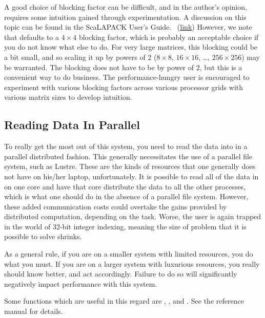 A good choice of blocking factor can be difficult, and in the author's opinion, requires some intuition gained through experimentation.  A discussion on this topic can be found in the ScaLAPACK User's Guide.~\citep{slug} (\href{http://www.netlib.org/utk/papers/scalapack/node19.html}{link}) However, we note that  defaults to a $4\times 4$ blocking factor, which is probably an acceptable choice if you do not know what else to do.  For very large matrices, this blocking could be a bit small, and so scaling it up by powers of 2 ($8\times 8$, $16\times 16$, \dots, $256\times 256$) may be warranted.  The blocking does not have to be by power of 2, but this is a convenient way to do business.  The performance-hungry user is encouraged to experiment with various blocking factors across various processor grids with various matrix sizes to develop intuition.



\subsection[]{Reading Data In Parallel}

To really get the most out of this system, you need to read the data into  in a parallel distributed fashion.  This generally necessitates the use of a parallel file system, such as Lustre.  These are the kinds of resources that one generally does not have on his/her laptop, unfortunately.  It is possible to read all of the data in on one core and have that core distribute the data to all the other processes, which is what one should do in the absence of a parallel file system.  However, these added communication costs could  overtake the gains provided by distributed computation, depending on the task.  Worse, the user is again trapped in the world of 32-bit integer indexing, meaning the size of problem that it is possible to solve shrinks.

As a general rule, if you are on a smaller system with limited resources, you do what you must.  If you are on a larger system with luxurious resources, you really should know better, and act accordingly.  Failure to do so will significantly negatively impact performance with this system.

Some functions which are useful in this regard are , , and .  See the reference manual for details.





